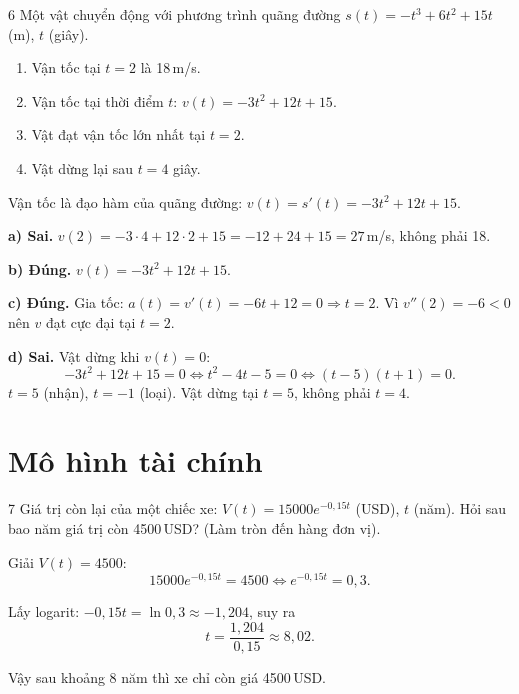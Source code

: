 \separator

\begin{baitoan}{6 \hfill {}}
Một vật chuyển động với phương trình quãng đường $s(t) = -t^3 + 6t^2 + 15t$ (m), $t$ (giây).

\begin{enumerate}[label=\alph*), leftmargin=2em]
  \item Vận tốc tại $t = 2$ là 18\,m/s.
  \item Vận tốc tại thời điểm $t$: $v(t) = -3t^2 + 12t + 15$.
  \item Vật đạt vận tốc lớn nhất tại $t = 2$.
  \item Vật dừng lại sau $t = 4$ giây.
\end{enumerate}
\end{baitoan}

\begin{loigiai}
Vận tốc là đạo hàm của quãng đường: $v(t) = s'(t) = -3t^2 + 12t + 15$.

\textbf{a) Sai.} $v(2) = -3 \cdot 4 + 12 \cdot 2 + 15 = -12 + 24 + 15 = \boxed{27}$\,m/s, không phải 18.

\textbf{b) Đúng.} $v(t) = -3t^2 + 12t + 15$.

\textbf{c) Đúng.} Gia tốc: $a(t) = v'(t) = -6t + 12 = 0 \Rightarrow t = 2$. Vì $v''(2) = -6 < 0$ nên $v$ đạt cực đại tại $t = 2$.

\textbf{d) Sai.} Vật dừng khi $v(t) = 0$:
\[ -3t^2 + 12t + 15 = 0 \Leftrightarrow t^2 - 4t - 5 = 0 \Leftrightarrow (t-5)(t+1) = 0. \]
$t = 5$ (nhận), $t = -1$ (loại). Vật dừng tại $t = 5$, không phải $t = 4$.
\end{loigiai}

\separator

\section{Mô hình tài chính}

\begin{baitoan}{7 \hfill {}}
Giá trị còn lại của một chiếc xe: $V(t) = 15000e^{-0{,}15t}$ (USD), $t$ (năm). Hỏi sau bao năm giá trị còn 4500\,USD? (Làm tròn đến hàng đơn vị).
\end{baitoan}

\begin{loigiai}
Giải $V(t) = 4500$:
\[ 15000e^{-0{,}15t} = 4500 \Leftrightarrow e^{-0{,}15t} = 0{,}3. \]

Lấy logarit: $-0{,}15t = \ln 0{,}3 \approx -1{,}204$, suy ra
\[ t = \frac{1{,}204}{0{,}15} \approx 8{,}02. \]

Vậy sau khoảng $\boxed{8}$ năm thì xe chỉ còn giá 4500\,USD.
\end{loigiai}

